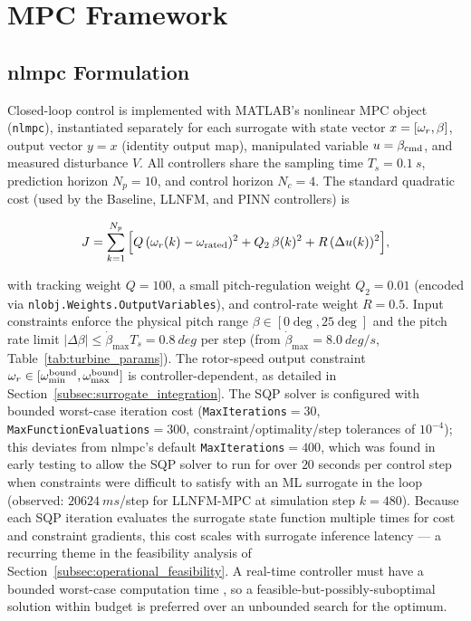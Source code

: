 
\section{MPC Framework}
\label{sec:mpc_framework}

\subsection{nlmpc Formulation}
\label{subsec:nlmpc_formulation}

Closed-loop control is implemented with MATLAB's nonlinear MPC object
(\texttt{nlmpc}), instantiated separately for each surrogate with state
vector $x=[\omega_r,\beta]$, output vector $y=x$ (identity output map),
manipulated variable $u=\beta_{\text{cmd}}$, and measured disturbance $V$. All
controllers share the sampling time $T_s = \SI{0.1}{s}$, prediction
horizon $N_p = 10$, and control horizon $N_c = 4$. The standard quadratic
cost (used by the Baseline, LLNFM, and PINN controllers) is

\begin{equation}
J = \sum_{k=1}^{N_p} \Big[ Q\,(\omega_r(k)-\omega_{\text{rated}})^2
+ Q_2\,\beta(k)^2 + R\,(\Delta u(k))^2 \Big],
\label{eq:mpc_cost_standard}
\end{equation}

with tracking weight $Q=100$, a small pitch-regulation weight
$Q_2=0.01$ (encoded via \texttt{nlobj.Weights.OutputVariables}), and
control-rate weight $R=0.5$. Input constraints enforce the physical pitch
range $\beta \in [0\deg,25\deg]$ and the pitch rate limit
$|\Delta\beta| \le \dot\beta_{\max} T_s = \SI{0.8}{deg}$ per step
(from $\dot\beta_{\max}=\SI{8.0}{deg/s}$, Table~\ref{tab:turbine_params}).
The rotor-speed output constraint $\omega_r \in [\omega_{\min}^{\text{bound}},
\omega_{\max}^{\text{bound}}]$ is controller-dependent, as detailed in
Section~\ref{subsec:surrogate_integration}. The SQP solver is configured
with bounded worst-case iteration cost
(\texttt{MaxIterations}$=30$, \texttt{MaxFunctionEvaluations}$=300$,
constraint/optimality/step tolerances of $10^{-4}$); this deviates from
nlmpc's default \texttt{MaxIterations}$=400$, which was found in early
testing to allow the SQP solver to run for over $20$ seconds per control
step when constraints were difficult to satisfy with an ML surrogate in
the loop (observed: $\SI{20624}{ms}$/step for LLNFM-MPC at simulation step
$k=480$). Because each SQP iteration evaluates the surrogate state
function multiple times for cost and constraint gradients, this cost
scales with surrogate inference latency — a recurring theme in the
feasibility analysis of Section~\ref{subsec:operational_feasibility}. A
real-time controller must have a bounded worst-case computation time
\citep{richter2012,xi2013}, so a
feasible-but-possibly-suboptimal solution within budget is preferred over
an unbounded search for the optimum.

